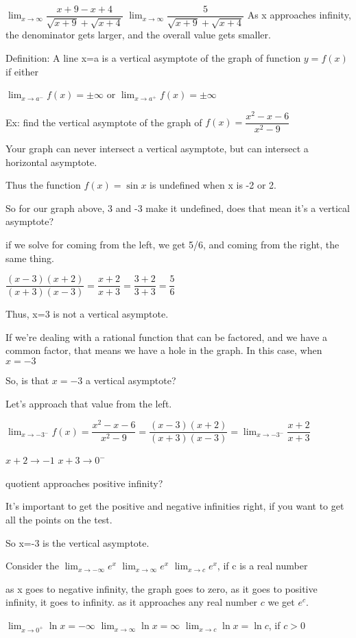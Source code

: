 \documentclass[12pt]{article}
\begin{document}
$\lim_{x\to\infty}\dfrac{x+9 - x+4}{\sqrt{x+9} + \sqrt{x+4}}$
$\lim_{x\to\infty}\dfrac{5}{\sqrt{x+9} + \sqrt{x+4}}$
As x approaches infinity, the denominator gets larger, and the overall value gets smaller.

Definition: A line x=a is a vertical asymptote of the graph of function $y=f(x)$ if either 

$\lim_{x\to a^-}f(x) = \pm\infty$ or $\lim_{x\to a^+}f(x) = \pm\infty$

Ex: find the vertical asymptote of the graph of $f(x) = \dfrac{x^2-x-6}{x^2-9}$

Your graph can never intersect a vertical asymptote, but can intersect a horizontal asymptote.

Thus the function $f(x)=\sin x$ is undefined when x is -2 or 2.

So for our graph above, 3 and -3 make it undefined, does that mean it's a vertical asymptote?

if we solve for coming from the left, we get 5/6, and coming from the right, the same thing.

$\dfrac{(x-3)(x+2)}{(x+3)(x-3)} = \dfrac{x+2}{x+3} = \dfrac{3+2}{3+3}= \dfrac{5}{6}$

Thus, x=3 is not a vertical asymptote.

If we're dealing with a rational function that can be factored, and we have a common factor, that means we
have a hole in the graph. In this case, when $x=-3$

So, is that $x=-3$ a vertical asymptote?

Let's approach that value from the left.

$\lim_{x\to -3^-}f(x) = \dfrac{x^2-x-6}{x^2-9} = \dfrac{(x-3)(x+2)}{(x+3)(x-3)}= \lim_{x\to
  -3^-}\dfrac{x+2}{x+3}$

$x+2\to-1$
$x+3\to0^-$

quotient approaches positive infinity?

It's important to get the positive and negative infinities right, if you want to get all the points on the
test.

So x=-3 is the vertical asymptote.

Consider the
 $\lim_{x\to-\infty}e^x$
$\lim_{x\to\infty}e^x$
$\lim_{x\to c}e^x$, if c is a real number

as x goes to negative infinity, the graph goes to zero, as it goes to positive infinity, it goes to
infinity. as it approaches any real number $c$ we get $e^c$.

$\lim_{x\to0^+}\ln x = -\infty$
$\lim_{x\to\infty}\ln x = \infty$
$\lim_{x\to c}\ln x = \ln c$, if $c > 0$
\end{document}
